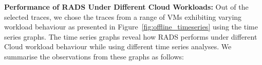 \textbf{Performance of RADS Under Different Cloud Workloads:}
Out of the selected traces, we chose the traces from a range of VMs exhibiting varying workload behaviour as presented in Figure~\ref{fig:offline_timeseries} using the time series graphs. 
The time series graphs reveal how RADS performs under different Cloud workload behaviour while using different time series analyses. We summarise the observations from these graphs as follows:

